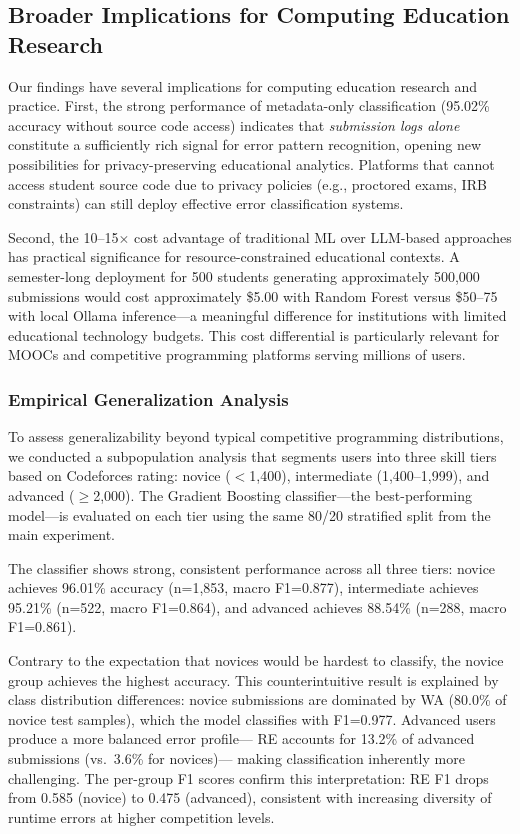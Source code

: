 \documentclass[acmsmall]{acmart}
\begin{document}
\subsection{Broader Implications for Computing Education Research}

Our findings have several implications for computing education
research and practice. First, the strong performance of metadata-only
classification (95.02\% accuracy without source code access) indicates that
\textit{submission logs alone} constitute a sufficiently rich signal for
error pattern recognition, opening new possibilities for privacy-preserving
educational analytics. Platforms that cannot access student source code
due to privacy policies (e.g., proctored exams, IRB constraints) can
still deploy effective error classification systems.

Second, the 10--15$\times$ cost advantage of traditional ML over LLM-based
approaches has practical significance for resource-constrained educational
contexts. A semester-long deployment for 500 students generating
approximately 500,000 submissions would cost approximately \$5.00 with Random
Forest versus \$50--75 with local Ollama inference---a meaningful difference
for institutions with limited educational technology budgets. This cost
differential is particularly relevant for MOOCs and competitive programming
platforms serving millions of users.

\subsubsection*{Empirical Generalization Analysis}
To assess generalizability beyond typical competitive programming
distributions, we conducted a subpopulation analysis that segments users into
three skill tiers based on Codeforces rating: novice ($<$1,400), intermediate
(1,400--1,999), and advanced ($\geq$2,000). The Gradient Boosting
classifier---the best-performing model---is evaluated on each tier using the
same 80/20 stratified split from the main experiment.

The classifier shows strong, consistent performance across all three tiers:
novice achieves 96.01\% accuracy (n=1,853, macro F1=0.877), intermediate
achieves 95.21\% (n=522, macro F1=0.864), and advanced achieves 88.54\%
(n=288, macro F1=0.861).

Contrary to the expectation that novices would be hardest to classify,
the novice group achieves the highest accuracy. This counterintuitive result
is explained by class distribution differences: novice submissions are
dominated by WA (80.0\% of novice test samples), which the model classifies
with F1=0.977. Advanced users produce a more balanced error profile---
RE accounts for 13.2\% of advanced submissions (vs.\ 3.6\% for novices)---
making classification inherently more challenging. The per-group F1 scores
confirm this interpretation: RE F1 drops from 0.585 (novice) to 0.475
(advanced), consistent with increasing diversity of runtime errors at higher
competition levels.
\end{document}
